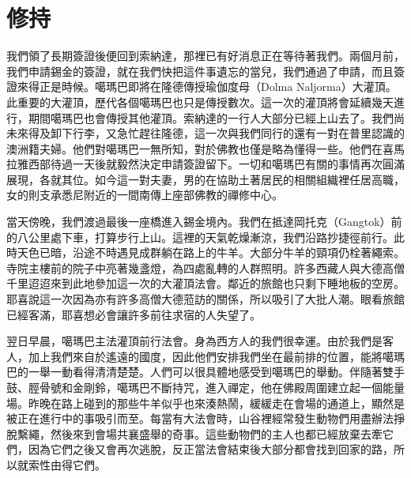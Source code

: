 \chapter{修持}

我們領了長期簽證後便回到索納達，那裡已有好消息正在等待著我們。兩個月前，我們申請錫金的簽證，就在我們快把這件事遺忘的當兒，我們通過了申請，而且簽證來得正是時候。噶瑪巴即將在隆德傳授瑜伽度母（Dolma
Naljorma）大灌頂。此重要的大灌頂，歷代各個噶瑪巴也只是傳授數次。這一次的灌頂將會延續幾天進行，期間噶瑪巴也會傳授其他灌頂。索納達的一行人大部分已經上山去了。我們尚未來得及卸下行李，又急忙趕往隆德，這一次與我們同行的還有一對在普里認識的澳洲籍夫婦。他們對噶瑪巴一無所知，對於佛教也僅是略為懂得一些。他們在喜馬拉雅西部待過一天後就毅然決定申請簽證留下。一切和噶瑪巴有關的事情再次圓滿展現，各就其位。如今這一對夫妻，男的在協助土著居民的相關組織裡任居高職，女的則支承悉尼附近的一間南傳上座部佛教的禪修中心。

當天傍晚，我們渡過最後一座橋進入錫金境內。我們在抵達岡托克（Gangtok）前的八公里處下車，打算步行上山。這裡的天氣乾燥漸涼，我們沿路抄捷徑前行。此時天色已暗，沿途不時遇見成群躺在路上的牛羊。大部分牛羊的頸項仍栓著繩索。寺院主樓前的院子中亮著幾盞燈，為四處亂轉的人群照明。許多西藏人與大德高僧千里迢迢來到此地參加這一次的大灌頂法會。鄰近的旅館也只剩下睡地板的空房。耶喜說這一次因為亦有許多高僧大德蒞訪的關係，所以吸引了大批人潮。眼看旅館已經客滿，耶喜想必會讓許多前往求宿的人失望了。



翌日早晨，噶瑪巴主法灌頂前行法會。身為西方人的我們很幸運。由於我們是客人，加上我們來自於遙遠的國度，因此他們安排我們坐在最前排的位置，能將噶瑪巴的一舉一動看得清清楚楚。人們可以很具體地感受到噶瑪巴的舉動。伴隨著雙手鼓、脛骨號和金剛鈴，噶瑪巴不斷持咒，進入禪定，他在佛殿周圍建立起一個能量場。昨晚在路上碰到的那些牛羊似乎也來湊熱鬧，緩緩走在會場的通道上，顯然是被正在進行中的事吸引而至。每當有大法會時，山谷裡經常發生動物們用盡辦法掙脫繫繩，然後來到會場共襄盛舉的奇事。這些動物們的主人也都已經放棄去牽它們，因為它們之後又會再次逃脫，反正當法會結束後大部分都會找到回家的路，所以就索性由得它們。

